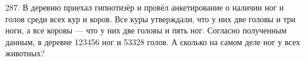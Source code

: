287. В деревню приехал гипнотизёр и провёл анкетирование о наличии ног и голов среди всех кур и коров. Все куры утверждали, что у них две головы и три ноги, а все коровы --- что у них две головы и пять ног. Согласно полученным данным, в деревне 123456 ног и 53328 голов. А сколько на самом деле ног у всех животных?\\
